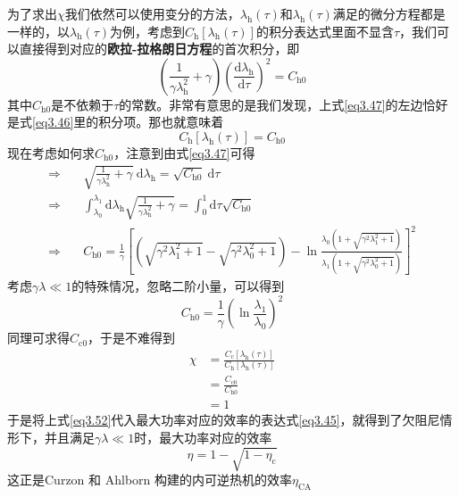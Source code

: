 为了求出$\chi$我们依然可以使用变分的方法，$\lambda_{\mathrm{h}}(\tau)$和$\lambda_{\mathrm{h}}(\tau)$满足的微分方程都是一样的，以$\lambda_{\mathrm{h}}(\tau)$为例，考虑到$C_{\mathrm{h}} [\lambda_{\mathrm{h}}(\tau)]$的积分表达式里面不显含$\tau$，我们可以直接得到对应的\textbf{欧拉-拉格朗日方程}的首次积分\cite{Wu2003}，即
\begin{equation}
    \left(\frac{1}{\gamma \lambda_{\mathrm{h}}^{2}}+\gamma\right)\left(\frac{\mathrm{d} \lambda_{\mathrm{h}}}{\mathrm{d} \tau}\right)^{2}=C_{\mathrm{h0}}
    \label{eq3.47}
\end{equation}
其中$C_{\mathrm{h0}}$是不依赖于$\tau$的常数。非常有意思的是我们发现，上式\eqref{eq3.47}的左边恰好是式\eqref{eq3.46}里的积分项。那也就意味着
\begin{equation}
    C_{\mathrm{h}} [\lambda_{\mathrm{h}}(\tau)]=C_{\mathrm{h0}}
    \label{eq3.49}
\end{equation}
现在考虑如何求$C_{\mathrm{h0}}$，注意到由式\eqref{eq3.47}可得
\begin{align}
    \Rightarrow \quad &\sqrt{\frac{1}{\gamma \lambda_{\mathrm{h}}^2}+\gamma} \ \mathrm{d} \lambda_{\mathrm{h}}=\sqrt{C_{\mathrm{h0}}} \ \mathrm{d} \tau\\
    \Rightarrow \quad& \int_{\lambda_0}^{\lambda_1} \mathrm{d}  \lambda_{\mathrm{h}} \sqrt{\frac{1}{\gamma \lambda_{\mathrm{h}}^2}+\gamma}=\int_{0}^{1} \mathrm{d} \tau \sqrt{C_{\mathrm{h0}}}\\
    \Rightarrow \quad& C_{\mathrm{h0}} =\frac{1}{\gamma} \left[\left(\sqrt{\gamma^{2} \lambda_{1} ^{2}+1}-\sqrt{\gamma^{2} \lambda_{0} ^{2}+1}\right)-\ln \frac{\lambda_{0}\left(1+\sqrt{\gamma^{2} \lambda_{1} ^{2}+1}\right) }{\lambda_{1} \left(1+\sqrt{\gamma^{2} \lambda_{0} ^{2}+1}\right)}\right]^2 
    \label{eq3.50}
\end{align}
考虑$\gamma \lambda \ll 1$的特殊情况，忽略二阶小量，可以得到
\begin{equation}
    C_{\mathrm{h0}}=\frac{1}{\gamma}\left(\ln \frac{\lambda_{1}}{\lambda_{0}}\right)^2
    \label{eq3.51}
\end{equation}
同理可求得$C_{\mathrm{c0}}$，于是不难得到
\begin{equation}
    \begin{split}
        \chi&=\frac{C_{\mathrm{c}} [\lambda_{\mathrm{h}}(\tau)]}{C_{\mathrm{h}} [\lambda_{\mathrm{h}}(\tau)]}\\
        &=\frac{C_{\mathrm{c0}}}{C_{\mathrm{h0}}}\\
        &=1
    \end{split}
    \label{eq3.52}
\end{equation}
于是将上式\eqref{eq3.52}代入最大功率对应的效率的表达式\eqref{eq3.45}，就得到了欠阻尼情形下，并且满足$\gamma \lambda \ll 1$时，最大功率对应的效率
\begin{equation}
    \eta=1-\sqrt{1-\eta_{\mathrm{c}}}
    \label{eq3.53}
\end{equation}
这正是Curzon 和 Ahlborn 构建的内可逆热机\cite{Curzon1975}的效率$\eta_{\mathrm{CA}}$
